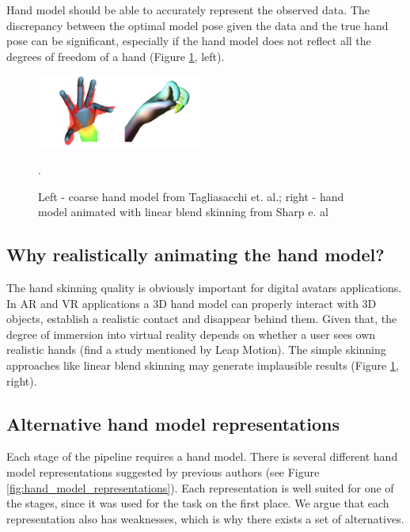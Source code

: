 Hand model should be able to accurately represent the observed data.  The discrepancy between the optimal model pose given the data and the true hand pose can be significant, especially if the hand model does not reflect all the degrees of freedom of a hand (Figure \ref{fig:coarse_hand_model_and_lbs}, left).

\begin{figure}[h!] 
	\centering
	\hspace{-2em}
	\includegraphics[width=0.5\textwidth]{fig/coarse_hand_model_and_lbs}
	\caption{Left - coarse hand model  from Tagliasacchi et. al.; right - hand model animated with linear blend skinning from Sharp e. al }.
	\label{fig:coarse_hand_model_and_lbs}
\end{figure}

\subsection{Why realistically animating the hand model?}

The hand skinning quality is obviously important for digital avatars applications. In AR and VR applications a 3D hand model can properly interact with 3D objects, establish a realistic contact and disappear behind them. Given that, the degree of immersion into virtual reality depends on whether a user sees own realistic hands \textcolor{mygray}{(find a study mentioned by Leap Motion).} The simple skinning approaches like linear blend skinning may generate implausible results  (Figure \ref{fig:coarse_hand_model_and_lbs}, right).

\subsection{Alternative hand model representations}
Each stage of the pipeline requires a hand model. There is several different hand model representations suggested by previous authors (see Figure \ref{fig:hand_model_representations}). Each representation is well suited for one of the stages, since it was used for the task on the first place. We argue that each representation also has weaknesses, which is why there exists a set of alternatives.

